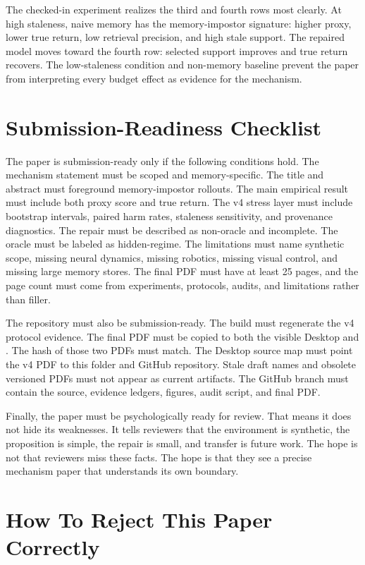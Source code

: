 \documentclass{article}
\begin{document}
The checked-in experiment realizes the third and fourth rows most clearly. At
high staleness, naive memory has the memory-impostor signature: higher proxy,
lower true return, low retrieval precision, and high stale support. The
repaired model moves toward the fourth row: selected support improves and true
return recovers. The low-staleness condition and non-memory baseline prevent
the paper from interpreting every budget effect as evidence for the mechanism.

\section{Submission-Readiness Checklist}
\label{app:readiness}

The paper is submission-ready only if the following conditions hold. The
mechanism statement must be scoped and memory-specific. The title and abstract
must foreground memory-impostor rollouts. The main empirical result must
include both proxy score and true return. The v4 stress layer must include
bootstrap intervals, paired harm rates, staleness sensitivity, and provenance
diagnostics. The repair must be described as non-oracle and incomplete. The
oracle must be labeled as hidden-regime. The limitations must name synthetic
scope, missing neural dynamics, missing robotics, missing visual control, and
missing large memory stores. The final PDF must have at least 25 pages, and
the page count must come from experiments, protocols, audits, and limitations
rather than filler.

The repository must also be submission-ready. The build must regenerate the
v4 protocol evidence. The final PDF must be copied to both the visible Desktop
and . The hash of those two PDFs must match. The Desktop
source map must point the v4 PDF to this folder and GitHub repository. Stale
draft names and obsolete versioned PDFs must not appear as current artifacts.
The GitHub branch must contain the source, evidence ledgers, figures, audit
script, and final PDF.

Finally, the paper must be psychologically ready for review. That means it
does not hide its weaknesses. It tells reviewers that the environment is
synthetic, the proposition is simple, the repair is small, and transfer is
future work. The hope is not that reviewers miss these facts. The hope is that
they see a precise mechanism paper that understands its own boundary.

\section{How To Reject This Paper Correctly}
\label{app:correct-rejection}
\end{document}
